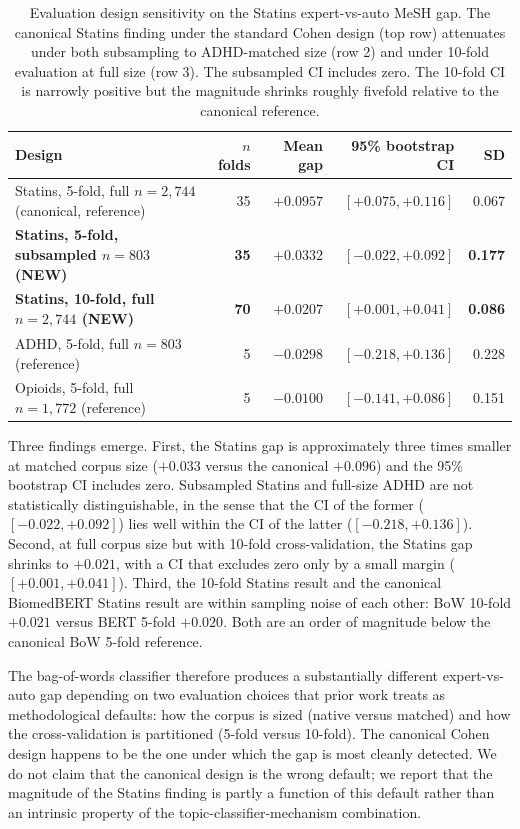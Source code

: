 \documentclass[11pt,a4paper]{article}
\begin{document}
\begin{table}[h]
\centering
\small
\begin{tabular}{lrrrr}
\toprule
Design & $n$ folds & Mean gap & 95\% bootstrap CI & SD \\
\midrule
Statins, 5-fold, full $n = 2{,}744$ (canonical, reference)   & 35  & $+0.0957$ & $[+0.075, +0.116]$  & 0.067 \\
\textbf{Statins, 5-fold, subsampled $n = 803$ (NEW)}          & \textbf{35}  & \textbf{$+0.0332$} & \textbf{$[-0.022, +0.092]$} & \textbf{0.177} \\
\textbf{Statins, 10-fold, full $n = 2{,}744$ (NEW)}            & \textbf{70}  & \textbf{$+0.0207$} & \textbf{$[+0.001, +0.041]$} & \textbf{0.086} \\
ADHD, 5-fold, full $n = 803$ (reference)                       & 5   & $-0.0298$ & $[-0.218, +0.136]$  & 0.228 \\
Opioids, 5-fold, full $n = 1{,}772$ (reference)                 & 5   & $-0.0100$ & $[-0.141, +0.086]$  & 0.151 \\
\bottomrule
\end{tabular}
\caption{Evaluation design sensitivity on the Statins expert-vs-auto MeSH gap. The canonical Statins finding under the standard Cohen design (top row) attenuates under both subsampling to ADHD-matched size (row 2) and under 10-fold evaluation at full size (row 3). The subsampled CI includes zero. The 10-fold CI is narrowly positive but the magnitude shrinks roughly fivefold relative to the canonical reference.}
\label{tab:design_sensitivity}
\end{table}

Three findings emerge. First, the Statins gap is approximately three times smaller at matched corpus size ($+0.033$ versus the canonical $+0.096$) and the 95\% bootstrap CI includes zero. Subsampled Statins and full-size ADHD are not statistically distinguishable, in the sense that the CI of the former ($[-0.022, +0.092]$) lies well within the CI of the latter ($[-0.218, +0.136]$). Second, at full corpus size but with 10-fold cross-validation, the Statins gap shrinks to $+0.021$, with a CI that excludes zero only by a small margin ($[+0.001, +0.041]$). Third, the 10-fold Statins result and the canonical BiomedBERT Statins result are within sampling noise of each other: BoW 10-fold $+0.021$ versus BERT 5-fold $+0.020$. Both are an order of magnitude below the canonical BoW 5-fold reference.

The bag-of-words classifier therefore produces a substantially different expert-vs-auto gap depending on two evaluation choices that prior work treats as methodological defaults: how the corpus is sized (native versus matched) and how the cross-validation is partitioned (5-fold versus 10-fold). The canonical Cohen design happens to be the one under which the gap is most cleanly detected. We do not claim that the canonical design is the wrong default; we report that the magnitude of the Statins finding is partly a function of this default rather than an intrinsic property of the topic-classifier-mechanism combination.
\end{document}

